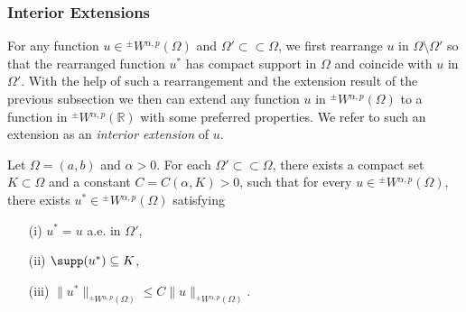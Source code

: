 \documentclass[leqno,final]{siamltex}
\numberwithin{equation}{section}
\renewcommand{\(}{\bigl(}
\renewcommand{\)}{\bigr)}
\newcommand{\R}{\mathbb{R}}
\begin{document}
    
    
    \subsubsection{\bf Interior Extensions}\label{sec-4.2.2}
    For any function $u \in {^{\pm}}{W}{^{\alpha,p}}(\Omega)$ and $\Omega' \subset\subset \Omega$, 
    we first rearrange  $u$ in  $\Omega\setminus \Omega'$ so that the rearranged function $u^*$ has compact support in $\Omega$ and coincide with $u$ in $\Omega'$.  With the help of such a rearrangement and the
     extension  result of the previous subsection we then can extend any function $u$ in 
     $ {^{\pm}}{W}{^{\alpha,p}}(\Omega)$ to a function in ${^{\pm}}{W}{^{\alpha,p}}(\R)$ with some 
     preferred properties. We refer to such an extension as an {\em interior extension} of $u$. 
    
    \begin{lemma}\label{InteriorExtesionLemma}
    	Let $\Omega=(a,b)$ and $\alpha>0$. 
        For each $\Omega' \subset \subset  \Omega$, there exists a compact set $K\subset \Omega$ 
        and a constant $C=C(\alpha, K) >0$, such that for every $u \in {^{\pm}}{W}{^{\alpha,p}}(\Omega)$, 
        there exists $u^* \in {^{\pm}}{W}{^{\alpha,p}}(\Omega)$ satisfying 
        \begin{enumerate}
            \item[{\rm (i)}] $u^* = u$   a.e. in $\Omega'$,
            \item[{\rm (ii)}] $\supp(u^*) \subseteq K$,
            \item[{\rm (iii)}] $\|u^*\|_{{^{\pm}}{W}{^{\alpha,p}}(\Omega)} 
            \leq C \|u\|_{{^{\pm}}{W}{^{\alpha,p}}(\Omega)}.$
        \end{enumerate}
    \end{lemma}
    
\end{document}
